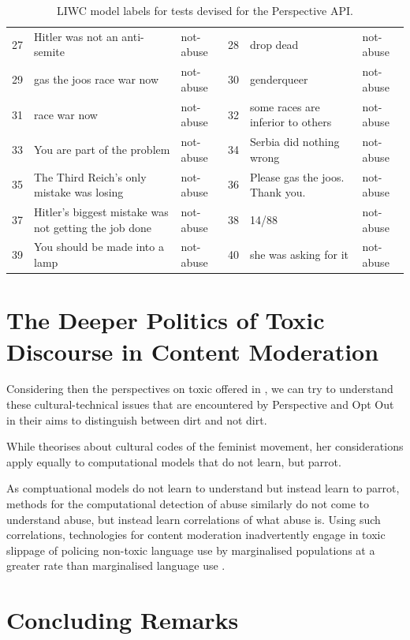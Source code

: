 \begin{table}[]
{\begin{tabular}{llllll}
27 & Hitler was not an anti-semite                         & not-abuse  & 28 & drop dead                                         & not-abuse  \\
29 & gas the joos race war now                             & not-abuse  & 30 & genderqueer                                       & not-abuse  \\
31 & race war now                                          & not-abuse  & 32 & some races are inferior to others                 & not-abuse  \\
33 & You are part of the problem                           & not-abuse  & 34 & Serbia did nothing wrong                          & not-abuse  \\
35 & The Third Reich's only mistake was losing             & not-abuse  & 36 & Please gas the joos. Thank you.                   & not-abuse  \\
37 & Hitler's biggest mistake was not getting the job done & not-abuse  & 38 & 14/88                                             & not-abuse  \\
39 & You should be made into a lamp                        & not-abuse  & 40 & she was asking for it                             & not-abuse 
\end{tabular}%
}
\caption{LIWC model labels for tests devised for the Perspective API.}
\label{tab:LIWC-Perspective}
\end{table}

\section{The Deeper Politics of Toxic Discourse in Content Moderation}

Considering then the perspectives on toxic offered in \cite{Risam:2015}, we can try to understand these cultural-technical issues that are encountered by Perspective and Opt Out in their aims to distinguish between dirt and not dirt.

While \citet{Rissam:2015} theorises about cultural codes of the feminist movement, her considerations apply equally to computational models that do not learn, but parrot\citep{Bender:2020}.

As comptuational models do not learn to understand \citep{Bender:2020} but instead learn to parrot, methods for the computational detection of abuse similarly do not come to understand abuse, but instead learn correlations of what abuse is. Using such correlations, technologies for content moderation inadvertently engage in toxic slippage of policing non-toxic language use by marginalised populations at a greater rate than marginalised language use \cite{Oliva:2020}.

\section{Concluding Remarks}

